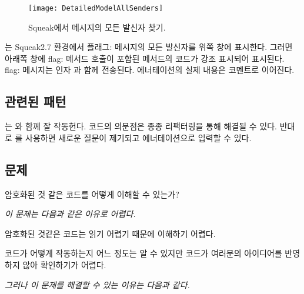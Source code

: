 \documentclass[a4paper,10pt,twoside]{book}
\begin{document}
\begin{figure}
\begin{center}
\texttt{[image: DetailedModelAllSenders]}
\caption{Squeak에서 메시지의 모든 발신자 찾기.}
\end{center}
\end{figure}

는 Squeak2.7 환경에서 플래그: 메시지의 모든 발신자를 위쪽 창에 표시한다. 그러면 아래쪽 창에 flag: 메서드 호출이 포함된  메서드의 코드가 강조 표시되어 표시된다. flag: 메시지는 인자 과 함께 전송된다. 에너테이션의 실제 내용은 코멘트로 이어진다. 

\subsection*{관련된 패턴}

는 와 함께 잘 작동헌다. 코드의 의문점은 종종 리팩터링을 통해 해결될 수 있다. 반대로 를 사용하면 새로운 질문이 제기되고 에너테이션으로 입력할 수 있다.



\subsection*{문제}

암호화된 것 같은 코드를 어떻게 이해할 수 있는가?

\emph{이 문제는 다음과 같은 이유로 어렵다.}

\begin{bulletlist}
\item 암호화된 것같은 코드는 읽기 어렵기 때문에 이해하기 어렵다.

\item 코드가 어떻게 작동하는지 어느 정도는 알 수 있지만 코드가 여러분의 아이디어를 반영하지 않아 확인하기가 어렵다.
\end{bulletlist}

\emph{그러나 이 문제를 해결할 수 있는 이유는 다음과 같다.}
\end{document}
